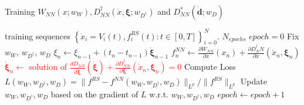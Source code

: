 \begin{algorithm}[H]
\caption{Training $W_{NN}(x; w_W), D_{NN}^\dagger(\dot{x}, \bm{\xi}; w_{D^\dagger})$ and $D_{NN}^*(\dot{\bm{d}}; w_D)$}\label{alg:TrainingOneEpoch}
\begin{algorithmic}
\Require training sequences $\left\{\dot{x}_i = V_{i}(t), f^{RS}_i(t) : t \in [0, T]\right\}_{i = 0}^N$.  
\Require $N_{epochs}$
\State $epoch = 0$
     
        \State Fix $w_W$, $w_{D^\dagger}$, $w_D$
         
            \State $\xi_n \gets \xi_{n-1} + (t_n-t_{n-1}) \dot{\bm{\xi}}_{n-1}$
            \State $f^{NN}_n \gets \frac{\partial W_{NN}}{\partial x}(x_n) + \frac{\partial D^\dagger_NN}{\partial \dot{x}}(\dot{x}_n, \bm{\xi}_n)$
            \State \textcolor{red}{$\bm{\dot{\xi}}_n \gets $ solution of $\frac{d D_{NN}}{d \dot{\boldsymbol{\xi}}}(\dot{\bm{\xi}}) + \frac{\partial D_{NN}^\dagger}{\partial \boldsymbol{\xi}}(\dot{x}_n, \bm{\xi}_n) = 0$}
        \EndFor
        \State Compute Loss $L(w_W, w_{D^\dagger}, w_D) = \|f^{RS} - f^{NN}(w_W, w_{D^\dagger}, w_D)\|_{{L}^p} / \|f^{RS}\|_{{L}^p}$
        \State Update $w_W, w_{D^\dagger}, w_D$ based on the gradient of $L$ w.r.t. $w_W, w_{D^\dagger}, w_D$
    \EndFor
    \State $epoch \gets epoch+1$
\EndWhile
\end{algorithmic}
\end{algorithm}